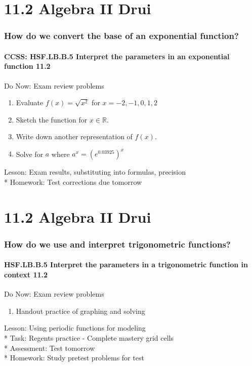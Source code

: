 \documentclass{beamer}
\begin{document}
\section{11.2 Algebra II Drui}
\frame
{
  \frametitle{How do we convert the base of an exponential function?}
  \framesubtitle{CCSS: HSF.LB.B.5 Interpret the parameters in an exponential function \qquad \alert{11.2}}

  \begin{block}{Do Now: Exam review problems}
  \begin{enumerate}
    \item Evaluate $f(x)=\sqrt{x^2}$ for $x=-2, -1, 0, 1, 2$
    \item Sketch the function for $x \in \mathbb{R}$.
    \item Write down another representation of $f(x)$.
    \item Solve for $a$ where $a^x=(e^{0.03925})^x$
    \end{enumerate}
  \end{block}
  Lesson: Exam results, substituting into formulas, precision\\*
  Homework: Test corrections due tomorrow\\}

\section{11.2 Algebra II Drui}
\frame
{
  \frametitle{How do we use and interpret trigonometric functions?}
  \framesubtitle{HSF.LB.B.5 Interpret the parameters in a trigonometric function in context \qquad \alert{11.2}}

  \begin{block}{Do Now: Exam review problems}
  \begin{enumerate}
    \item Handout practice of graphing and solving%
    \end{enumerate}
  \end{block}
  Lesson: Using periodic functions for modeling\\*
  Task: Regents practice - Complete mastery grid cells\\*
  Assessment: Test \alert{tomorrow}\\*
  Homework: Study pretest problems for test\\}
  
\end{document}
